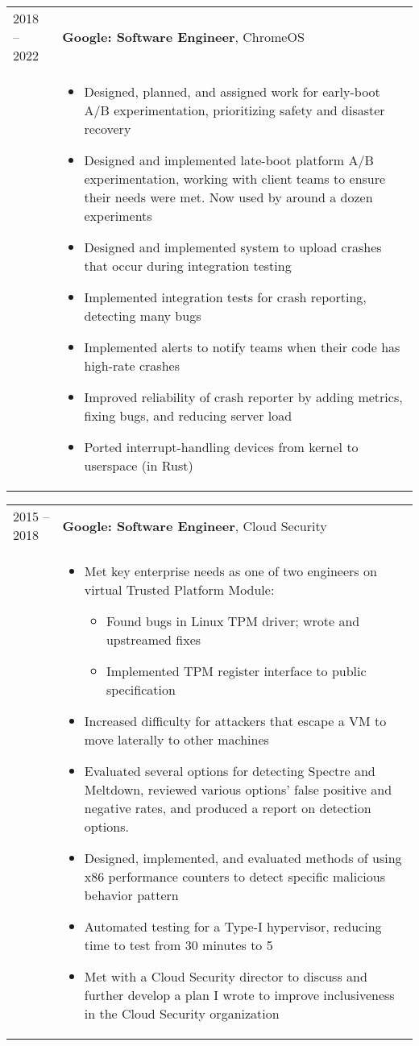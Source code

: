 \documentclass[overlapped]{res}
\newcommand{\experience}[5]{
  \hspace{-9ex}
  \begin{tabular}{m{12ex} m{\textwidth}}
    #1 -- #2 & \textbf{#3}, #4 \\
    & #5
  \end{tabular}
  \vspace{-3ex}
}
\begin{document}
\begin{resume}
  \experience{2018}{2022}{Google: Software Engineer}{ChromeOS}{
    \begin{itemize} \itemsep -1pt
        \item Designed, planned, and assigned work for early-boot A/B
          experimentation, prioritizing safety and disaster recovery
       \item Designed and implemented late-boot platform A/B experimentation,
         working with client teams to ensure their needs were met. Now used by
         around a dozen experiments
        \item Designed and implemented system to upload crashes that occur
          during integration testing
        \item Implemented integration tests for crash reporting, detecting many
          bugs
        \item Implemented alerts to notify teams when their code has high-rate
          crashes
        \item Improved reliability of crash reporter by adding metrics, fixing
          bugs, and reducing server load
        \item Ported interrupt-handling devices from kernel to userspace
          (in Rust)
    \end{itemize}
  }

  \experience{2015}{2018}{Google: Software Engineer}{Cloud Security}{
    \begin{itemize} \itemsep -1pt
        \item Met key enterprise needs as one of two engineers on virtual
          Trusted Platform Module:
          \vspace{-0.5em}
          \begin{itemize} \itemsep -1pt
            \item Found bugs in Linux TPM driver; wrote and upstreamed fixes
            \item Implemented TPM register interface to public specification
          \end{itemize}
        \item Increased difficulty for attackers that escape a VM to move
          laterally to other machines
        \item Evaluated several options for detecting Spectre and Meltdown,
          reviewed various options' false positive and negative rates, and
          produced a report on detection options.
        \item Designed, implemented, and evaluated methods of using x86
          performance counters to detect specific malicious behavior pattern
        \item Automated testing for a Type-I hypervisor, reducing time to test
          from 30 minutes to 5
        \item Met with a Cloud Security director to discuss and further develop
          a plan I wrote to improve inclusiveness in the Cloud Security
          organization
    \end{itemize}
  }


\end{resume}
\end{document}
